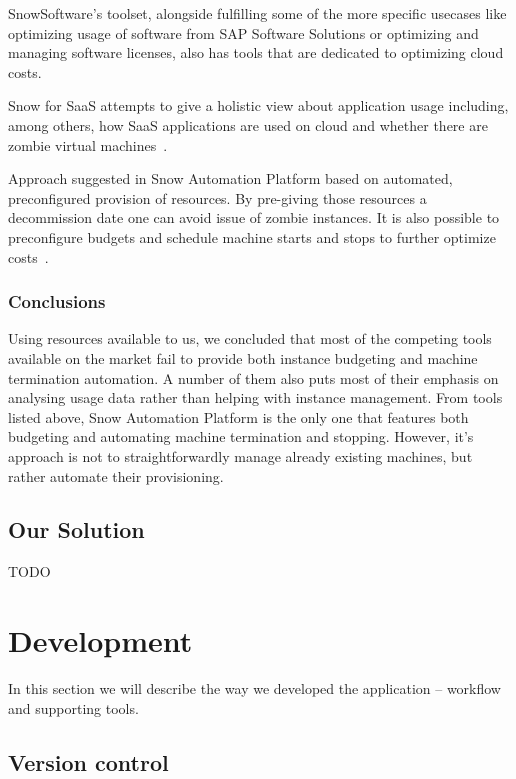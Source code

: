 \documentclass[licencjacka,en]{thesisclass}
\begin{document}
    SnowSoftware's toolset, alongside fulfilling some of the more specific usecases
    like optimizing usage of software from SAP Software Solutions or optimizing and managing software licenses,
    also has tools that are dedicated to optimizing cloud costs.

    Snow for SaaS attempts to give a holistic view about application usage including, among others,
    how SaaS applications are used on cloud and whether there are zombie virtual machines~\cite{SnowSaaS}.

    Approach suggested in Snow Automation Platform based on automated, preconfigured provision of resources.
    By pre-giving those resources a decommission date one can avoid issue of zombie instances.
    It is also possible to preconfigure budgets and schedule machine starts and stops to further optimize costs~\cite{SnowBlog}.

    \subsection{Conclusions}

    Using resources available to us, we concluded that most of the competing tools available on the market
    fail to provide both instance budgeting and machine termination automation.
    A number of them also puts most of their emphasis on analysing usage data rather than
    helping with instance management.
    From tools listed above, Snow Automation Platform is the only one that features both budgeting and automating
    machine termination and stopping.
    However, it's approach is not to straightforwardly manage already existing machines,
    but rather automate their provisioning.

    \section{Our Solution}

    TODO



    \chapter{Development}

    In this section we will describe the way we developed the application -- workflow and supporting tools.

    \section{Version control}
\end{document}
